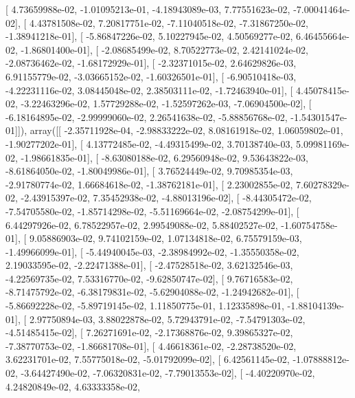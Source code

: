\documentclass{article}
\begin{document}
       [  4.73659988e-02,  -1.01095213e-01,  -4.18943089e-03,
          7.77551623e-02,  -7.00041464e-02],
       [  4.43781508e-02,   7.20817751e-02,  -7.11040518e-02,
         -7.31867250e-02,  -1.38941218e-01],
       [ -5.86847226e-02,   5.10227945e-02,   4.50569277e-02,
          6.46455664e-02,  -1.86801400e-01],
       [ -2.08685499e-02,   8.70522773e-02,   2.42141024e-02,
         -2.08736462e-02,  -1.68172929e-01],
       [ -2.32371015e-02,   2.64629826e-03,   6.91155779e-02,
         -3.03665152e-02,  -1.60326501e-01],
       [ -6.90510418e-03,  -4.22231116e-02,   3.08445048e-02,
          2.38503111e-02,  -1.72463940e-01],
       [  4.45078415e-02,  -3.22463296e-02,   1.57729288e-02,
         -1.52597262e-03,  -7.06904500e-02],
       [ -6.18164895e-02,  -2.99999060e-02,   2.26541638e-02,
         -5.88856768e-02,  -1.54301547e-01]]), array([[ -2.35711928e-04,  -2.98833222e-02,   8.08161918e-02,
          1.06059802e-01,  -1.90277202e-01],
       [  4.13772485e-02,  -4.49315499e-02,   3.70138740e-03,
          5.09981169e-02,  -1.98661835e-01],
       [ -8.63080188e-02,   6.29560948e-02,   9.53643822e-03,
         -8.61864050e-02,  -1.80049986e-01],
       [  3.76524449e-02,   9.70985354e-03,  -2.91780774e-02,
          1.66684618e-02,  -1.38762181e-01],
       [  2.23002855e-02,   7.60278329e-02,  -2.43915397e-02,
          7.35452938e-02,  -4.88013196e-02],
       [ -8.44305472e-02,  -7.54705580e-02,  -1.85714298e-02,
         -5.51169664e-02,  -2.08754299e-01],
       [  6.44297926e-02,   6.78522957e-02,   2.99549088e-02,
          5.88402527e-02,  -1.60754758e-01],
       [  9.05886903e-02,   9.74102159e-02,   1.07134818e-02,
          6.75579159e-03,  -1.49966099e-01],
       [ -5.44940045e-03,  -2.38984992e-02,  -1.35550358e-02,
          2.19033595e-02,  -2.22471388e-01],
       [ -2.47528518e-02,   3.62132546e-03,  -4.22569735e-02,
          7.53316770e-02,  -9.62850747e-02],
       [  9.76716583e-02,  -8.71475792e-02,  -6.38179831e-02,
         -5.62904088e-02,  -1.24942682e-01],
       [ -5.86692228e-02,  -5.89719145e-02,   1.11850775e-01,
          1.12335898e-01,  -1.88104139e-01],
       [  2.97750894e-03,   3.88022878e-02,   5.72943791e-02,
         -7.54791303e-02,  -4.51485415e-02],
       [  7.26271691e-02,  -2.17368876e-02,   9.39865327e-02,
         -7.38770753e-02,  -1.86681708e-01],
       [  4.46618361e-02,  -2.28738520e-02,   3.62231701e-02,
          7.55775018e-02,  -5.01792099e-02],
       [  6.42561145e-02,  -1.07888812e-02,  -3.64427490e-02,
         -7.06320831e-02,  -7.79013553e-02],
       [ -4.40220970e-02,   4.24820849e-02,   4.63333358e-02,
\end{document}
